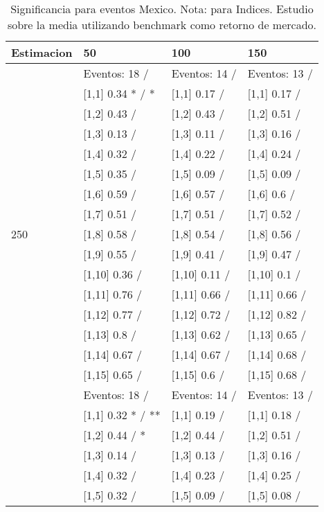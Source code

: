 \begin{table}

\caption{Significancia para eventos Mexico. Nota: para Indices. Estudio sobre la media utilizando benchmark como retorno de mercado.}
\centering
\begin{tabular}[t]{llll}
\toprule
Estimacion & 50 & 100 & 150\\
\midrule
 & Eventos:  18 / & Eventos:  14 / & Eventos:  13 /\\
 & {}[1,1] 0.34 * / * & {}[1,1] 0.17  / & {}[1,1] 0.17  /\\
 & {}[1,2] 0.43  / & {}[1,2] 0.43  / & {}[1,2] 0.51  /\\
 & {}[1,3] 0.13  / & {}[1,3] 0.11  / & {}[1,3] 0.16  /\\
 & {}[1,4] 0.32  / & {}[1,4] 0.22  / & {}[1,4] 0.24  /\\
\addlinespace
 & {}[1,5] 0.35  / & {}[1,5] 0.09  / & {}[1,5] 0.09  /\\
 & {}[1,6] 0.59  / & {}[1,6] 0.57  / & {}[1,6] 0.6  /\\
 & {}[1,7] 0.51  / & {}[1,7] 0.51  / & {}[1,7] 0.52  /\\
250 & {}[1,8] 0.58  / & {}[1,8] 0.54  / & {}[1,8] 0.56  /\\
 & {}[1,9] 0.55  / & {}[1,9] 0.41  / & {}[1,9] 0.47  /\\
\addlinespace
 & {}[1,10] 0.36  / & {}[1,10] 0.11  / & {}[1,10] 0.1  /\\
 & {}[1,11] 0.76  / & {}[1,11] 0.66  / & {}[1,11] 0.66  /\\
 & {}[1,12] 0.77  / & {}[1,12] 0.72  / & {}[1,12] 0.82  /\\
 & {}[1,13] 0.8  / & {}[1,13] 0.62  / & {}[1,13] 0.65  /\\
 & {}[1,14] 0.67  / & {}[1,14] 0.67  / & {}[1,14] 0.68  /\\
\addlinespace
 & {}[1,15] 0.65  / & {}[1,15] 0.6  / & {}[1,15] 0.68  /\\
 & Eventos:  18 / & Eventos:  14 / & Eventos:  13 /\\
 & {}[1,1] 0.32 * / ** & {}[1,1] 0.19  / & {}[1,1] 0.18  /\\
 & {}[1,2] 0.44  / * & {}[1,2] 0.44  / & {}[1,2] 0.51  /\\
 & {}[1,3] 0.14  / & {}[1,3] 0.13  / & {}[1,3] 0.16  /\\
\addlinespace
 & {}[1,4] 0.32  / & {}[1,4] 0.23  / & {}[1,4] 0.25  /\\
 & {}[1,5] 0.32  / & {}[1,5] 0.09  / & {}[1,5] 0.08  /\\

\end{tabular}
\end{table}
